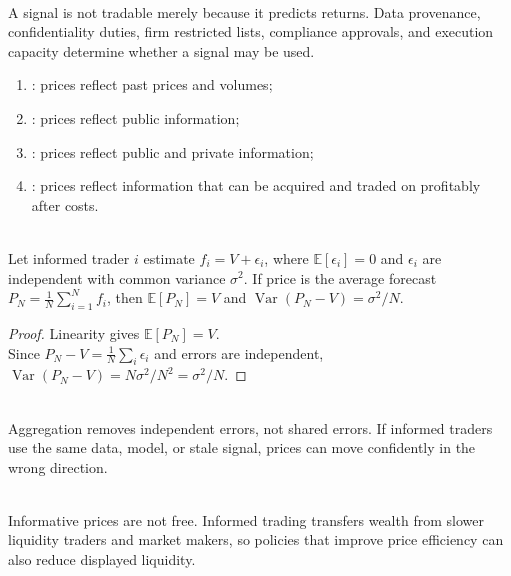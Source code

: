 \begin{principle} \\
A signal is not tradable merely because it predicts returns. Data provenance, confidentiality duties, firm restricted lists, compliance approvals, and execution capacity determine whether a signal may be used.
\end{principle}

\begin{taxonomy} 
\begin{enumerate}[label=\roman*.]
\setlength{\itemsep}{0pt}
\item {}: prices reflect past prices and volumes;
\item {}: prices reflect public information;
\item {}: prices reflect public and private information;
\item {}: prices reflect information that can be acquired and traded on profitably after costs.
\end{enumerate}
\end{taxonomy}

\begin{proposition} \\
Let informed trader $i$ estimate $f_i=V+\epsilon_i$, where $\mathbb{E}[\epsilon_i]=0$ and $\epsilon_i$ are independent with common variance $\sigma^2$. If price is the average forecast $P_N=\frac{1}{N}\sum_{i=1}^N f_i$, then $\mathbb{E}[P_N]=V$ and $\operatorname{Var}(P_N-V)=\sigma^2/N$.
\begin{proof}
Linearity gives $\mathbb{E}[P_N]=V$.\\
Since $P_N-V=\frac{1}{N}\sum_i\epsilon_i$ and errors are independent, $\operatorname{Var}(P_N-V)=N\sigma^2/N^2=\sigma^2/N$.
\end{proof}
\end{proposition}

\begin{caveat} \\
Aggregation removes independent errors, not shared errors. If informed traders use the same data, model, or stale signal, prices can move confidently in the wrong direction.
\end{caveat}

\begin{caveat} \\
Informative prices are not free. Informed trading transfers wealth from slower liquidity traders and market makers, so policies that improve price efficiency can also reduce displayed liquidity.
\end{caveat}
